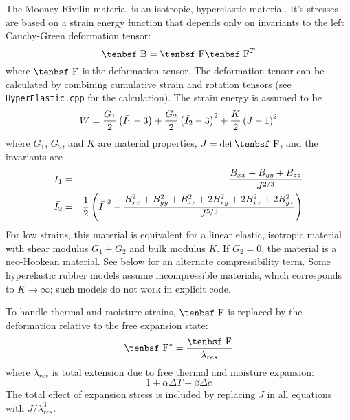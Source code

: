 \documentclass[11pt]{article}
\def\B{\hbox{\tenbsf B}}
\def\F{\hbox{\tenbsf F}}
\begin{document}
The Mooney-Rivilin material is an isotropic, hyperelastic material. It's stresses are based on a strain energy function that depends only on invariants to the left Cauchy-Green deformation tensor:
\begin{equation}
    \B = \F\F^T
\end{equation}
where $\F$ is the deformation tensor. The deformation tensor can be calculated by combining cumulative strain and rotation tensors (see {\tt HyperElastic.cpp} for the calculation). The strain energy is assumed to be
\begin{equation}
W = {G_1\over2}\left(\bar{I_1}-3\right) + {G_2\over2}\left(\bar{I_2}-3\right)^2 + {K\over2}\left(J-1\right)^2
\end{equation}
where $G_1$, $G_2$, and $K$ are material properties, $J=\det\F$, and the invariants are
\begin{eqnarray}
   \bar{I_1} & = & {B_{xx}+B_{yy}+B_{zz}\over J^{2/3}} \\
   \bar{I_2} & = & {1\over2}\left(\bar{I_1}^2 - {B_{xx}^2+B_{yy}^2+B_{zz}^2+2B_{xy}^2+2B_{xz}^2+2B_{yz}^2\over J^{5/3}}\right)
\end{eqnarray}
For low strains, this material is equivalent for a linear elastic, isotropic material with shear modulus $G_1+G_2$ and bulk modulus $K$. If $G_2=0$, the material is a neo-Hookean material. See below for an alternate compressibility term. Some hyperelastic rubber models assume incompressible materials, which corresponds to $K\to\infty$; such models do not work in explicit code.

To handle thermal and moisture strains, $\F$ is replaced by the deformation relative to the free expansion state:
\begin{equation}
     \F^* = {\F\over \lambda_{res}}
\end{equation}
where $\lambda_{res}$ is total extension due to free thermal and moisture expansion:
\begin{equation}
    1 + \alpha\Delta T + \beta \Delta c
\end{equation}
The total effect of expansion stress is included by replacing $J$ in all equations with $J/\lambda_{res}^3$.
\end{document}

